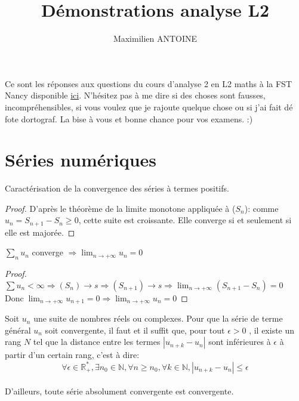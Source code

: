 \documentclass[12pt]{article}
\newenvironment{theorem}[2][Théorème]{\begin{trivlist}
\item[\hskip \labelsep {\bfseries #1}\hskip \labelsep {\bfseries #2.}]}{\end{trivlist}}
\newenvironment{definition}[2][Définition]{\begin{trivlist}
\item[\hskip \labelsep {\bfseries #1}\hskip \labelsep {\bfseries #2.}]}{\end{trivlist}}
\begin{document}
 
 
\title{Démonstrations analyse L2} 
\author{Maximilien ANTOINE} %
\maketitle

\noindent Ce sont les réponses aux questions du cours d'analyse 2 en L2 maths à la FST Nancy disponible \href{http://www.iecl.univ-lorraine.fr/~Anne.de-Roton/questions_cours_analyse2.pdf}{ici}. N'hésitez pas à me dire si des choses sont fausses, incompréhensibles, si vous voulez que je rajoute quelque chose ou si j'ai fait dé fote dortograf.
La bise à vous et bonne chance pour vos examens. :)

\section{Séries numériques}
\begin{theorem}{}
Caractérisation de la convergence des séries à termes positifs.
\end{theorem}
 
\begin{proof}  
D'après le théorème de la limite monotone appliquée à \big($S_n$\big): comme $u_n = S_{n+1} - S_n \ge 0$, cette suite est croissante. Elle converge si et seulement si elle est majorée.
\end{proof}
 \bigskip
\begin{theorem}{}
$\sum_{n} u_n$ converge $\Rightarrow \lim_{n\rightarrow+\infty}u_n=0$
\end{theorem}
\begin{proof}  
$\sum u_n < \infty \Rightarrow (S_n) \longrightarrow s \Rightarrow (S_{n+1}) \longrightarrow s \Rightarrow  \lim_{n\rightarrow+\infty}(S_{n+1}-S_n)=0$\\ Donc$\; \lim_{n\rightarrow+\infty}u_{n+1}=0\Rightarrow \lim_{n\rightarrow+\infty}u_n=0$
\end{proof}
\bigskip
\begin{definition}{: Critère de Cauchy}
Soit $u_n$ une suite de nombres réels ou complexes. Pour que la série de terme général $u_n$ soit convergente, il faut et il suffit que, pour tout $\epsilon > 0$ , il existe un rang $N$ tel que la distance entre les termes $|u_{n+k}-u_n|$ sont inférieures à $\epsilon$ à partir d'un certain rang, c'est à dire:
\[
\forall\epsilon\in\mathbb{R_+^*},\exists n_0 \in \mathbb{N}, \forall n \ge n_0, \forall k\in\mathbb{N}, |u_{n+k}-u_n|\leq\epsilon
\]\\
D'ailleurs, toute série absolument convergente est convergente.
\end{definition}
\end{document}
